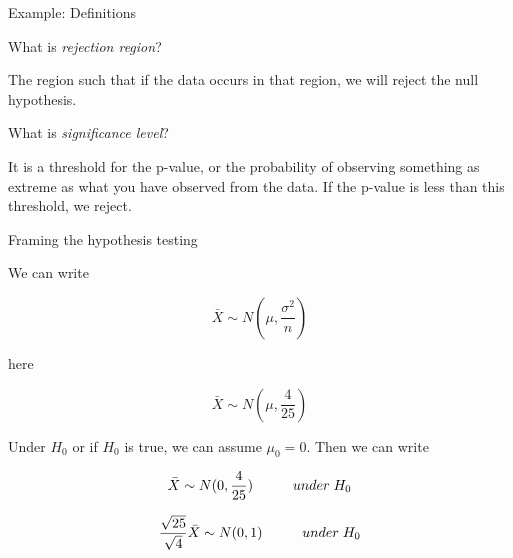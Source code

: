 \documentclass{beamer}\usepackage[]{graphicx}\usepackage[]{color}
\begin{document}
\begin{frame}{Example: Definitions}

What is \textit{rejection region}? \pause \newline

The region such that if the data occurs in that region, we will reject the null hypothesis. \pause \newline

What is \textit{significance level}?  \pause \newline

It is a threshold for the p-value, or the probability of observing something as extreme as what you have observed from the data. If the p-value is less than this threshold, we reject.

\end{frame}


\begin{frame}{Framing the hypothesis testing}

We can write 

$$ \bar{X} \sim N(\mu, \frac{\sigma^2}{n}) $$ \pause

here 

$$ \bar{X} \sim N(\mu, \frac{4}{25}) $$ \pause

Under $H_0$ or if $H_0$ is true, we can assume $\mu_0 = 0$. Then we can write 

$$ \bar{X} \sim N(0, \frac{4}{25}) \hspace{1 cm} under \; H_0 $$ \pause

$$ \frac{\sqrt{25}}{\sqrt{4}} \bar{X} \sim N(0,1) \hspace{1 cm} under \; H_0 $$

\end{frame}
\end{document}
